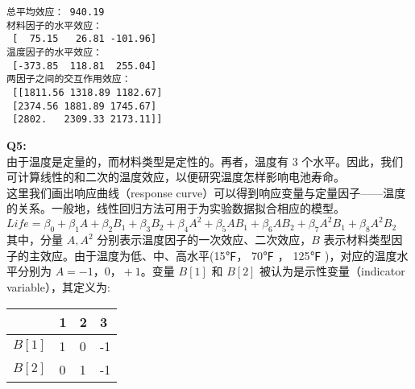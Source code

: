 \documentclass[11pt]{ctexart}
\begin{document}
    \begin{Verbatim}[commandchars=\\\{\}]
总平均效应： 940.19
材料因子的水平效应：
 [  75.15   26.81 -101.96]
温度因子的水平效应：
 [-373.85  118.81  255.04]
两因子之间的交互作用效应：
 [[1811.56 1318.89 1182.67]
 [2374.56 1881.89 1745.67]
 [2802.   2309.33 2173.11]]
    \end{Verbatim}

    \textbf{Q5:}\\
由于温度是定量的，而材料类型是定性的。再者，温度有 3
个水平。因此，我们可计算线性的和二次的温度效应，以便研究温度怎样影响电池寿命。\\
这里我们画出响应曲线（response
curve）可以得到响应变量与定量因子------温度的关系。一般地，线性回归方法可用于为实验数据拟合相应的模型。\\
\(Life = \beta_0+\beta_1A+\beta_2B_1+\beta_3B_2+\beta_4A^2+\beta_5AB_1+\beta_6AB_2+\beta_7A^2B_1+\beta_8A^2B_2\)\\
其中，分量 \(A, A^2\) 分别表示温度因子的一次效应、二次效应，\(B\)
表示材料类型因子的主效应。由于温度为低、中、高水平(15℉， 70℉ ， 125℉
)，对应的温度水平分别为 \(A=-1，0，+1\)。变量 \(B[1]\) 和 \(B[2]\)
被认为是示性变量（indicator variable），其定义为:

\begin{longtable}[]{llll}
\toprule
& 1 & 2 & 3 \\
\midrule
\endhead
\(B[1]\) & 1 & 0 & -1 \\
\(B[2]\) & 0 & 1 & -1 \\
\bottomrule
\end{longtable}
\end{document}
